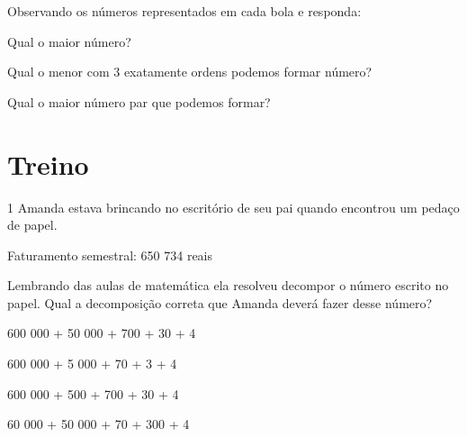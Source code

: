 Observando os números representados em cada bola e responda:

\begin{escolha}
\item  Qual o maior número?

\item  Qual o menor com 3 exatamente ordens podemos formar número?

\item  Qual o maior número par que podemos formar?

\end{escolha}


\section{Treino}

\num{1} Amanda estava brincando no escritório de seu pai quando encontrou um
pedaço de papel.


Faturamento semestral: 650 734 reais

Lembrando das aulas de matemática ela resolveu decompor o número escrito
no papel. Qual a decomposição correta que Amanda deverá fazer desse
número?

\begin{escolha}
\item
  600 000 + 50 000 + 700 + 30 + 4
\item
  600 000 + 5 000 + 70 + 3 + 4
\item
  600 000 + 500 + 700 + 30 + 4
\item
  60 000 + 50 000 + 70 + 300 + 4
\end{escolha}


